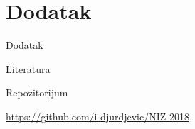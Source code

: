 \documentclass[serbian]{beamer}
\begin{document}
\section{Dodatak}

\begin{frame}{Dodatak}

\begin{flushleft}
	{\Large Literatura}
\end{flushleft}

\nocite{NumOpt}

\printbibliography

\begin{flushleft}
	{\Large Repozitorijum}
\end{flushleft}

\href{https://github.com/i-djurdjevic/NIZ-2018}{https://github.com/i-djurdjevic/NIZ-2018}

\end{frame}
\end{document}
